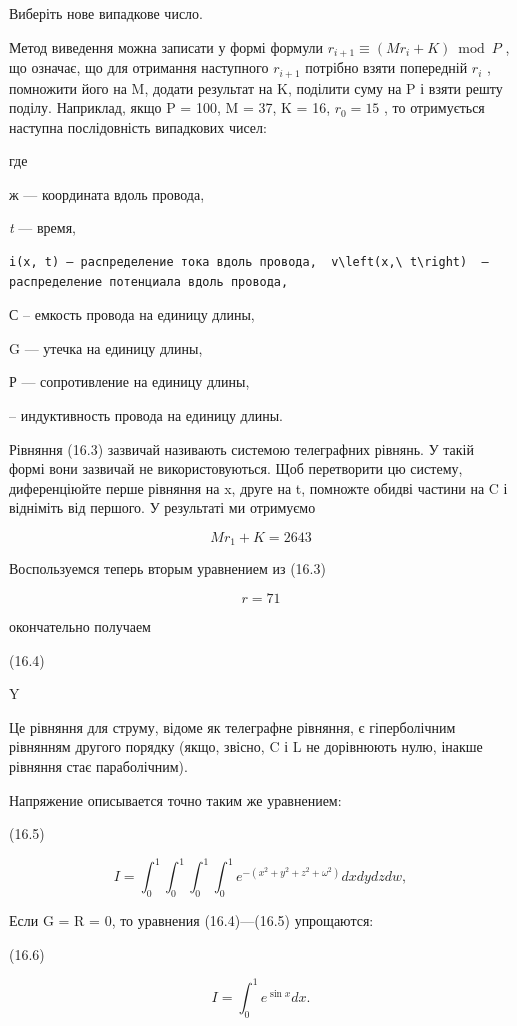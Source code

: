 \documentclass[
  ukrainian,
]{article}
\begin{document}
Виберіть нове випадкове число.

Метод виведення можна записати у формі формули
\(r_{i+1} \equiv (Mr_i + K) \bmod P\) , що означає, що для отримання
наступного \(r_{i+1}\) потрібно взяти попередній \(r_i\) , помножити
його на M, додати результат на K, поділити суму на P і взяти решту
поділу. Наприклад, якщо P = 100, M = 37, K = 16, \(r_0 = 15\) , то
отримується наступна послідовність випадкових чисел:

где

ж --- координата вдоль провода,

\emph{t} --- время,

\begin{verbatim}
i(x, t) — распределение тока вдоль провода,  v\left(x,\ t\right)  — распределение потенциала вдоль провода,
\end{verbatim}

С -- емкость провода на единицу длины,

G --- утечка на единицу длины,

Р --- сопротивление на единицу длины,

-- индуктивность провода на единицу длины.

Рівняння (16.3) зазвичай називають системою телеграфних рівнянь. У такій
формі вони зазвичай не використовуються. Щоб перетворити цю систему,
диференціюйте перше рівняння на x, друге на t, помножте обидві частини
на C і відніміть від першого. У результаті ми отримуємо

\[
Mr_1 + K = 2643
\]

Воспользуемся теперь вторым уравнением из (16.3)

\[
r = 71
\]

окончательно получаем

(16.4)

Y

Це рівняння для струму, відоме як телеграфне рівняння, є гіперболічним
рівнянням другого порядку (якщо, звісно, C і L не дорівнюють нулю,
інакше рівняння стає параболічним).

Напряжение описывается точно таким же уравнением:

(16.5)

\[
I = \int_{0}^{1} \int_{0}^{1} \int_{0}^{1} \int_{0}^{1} e^{-(x^{2}+y^{2}+z^{2}+\omega^{2})} dx dy dz dw,
\]

Если G = R = 0, то уравнения (16.4)---(16.5) упрощаются:

(16.6)

\[
I = \int_{0}^{1} e^{\sin x} dx.
\]
\end{document}
